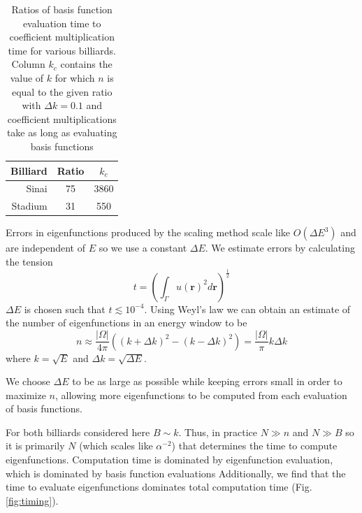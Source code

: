 \documentclass{report}
\newcommand{\rr}[0]{\mathbf{r}}
\begin{document}
\begin{table}
  \centering
  \begin{tabular}{|r|c|c|}
    \hline
    Billiard & Ratio & $k_c$ \\ \hline
    \hline
    Sinai & 75 & 3860 \\ \hline
    Stadium & 31 & 550 \\
    \hline
  \end{tabular}
  \caption{Ratios of basis function evaluation time to coefficient multiplication time for various billiards. Column $k_c$ contains the value of $k$ for which $n$ is equal to the given ratio with $\Delta k = 0.1$ and coefficient multiplications take as long as evaluating basis functions}
  \label{tab:eval_ratios}
\end{table}

Errors in eigenfunctions produced by the scaling method scale like $O({\Delta E}^{3})$ \cite{barnett_hassell} and are independent of $E$ so we use a constant $\Delta E$. We estimate errors by calculating the tension
\[
t = \left( \int_{\Gamma} u(\rr)^{2} d\rr \right)^{\frac{1}{2}}
\]
$\Delta E$ is chosen such that $t \lesssim 10^{-4}$. Using Weyl's law we can obtain an estimate of the number of eigenfunctions in an energy window to be
\[
n \approx \frac{\vert \Omega \vert}{4 \pi} ((k + \Delta k)^{2} - (k - \Delta k)^{2}) = \frac{\vert \Omega \vert}{\pi} k \Delta k
\]
where $k = \sqrt{E}$ and $\Delta k = \sqrt{\Delta E}$.

We choose $\Delta E$ to be as large as possible while keeping errors small in order to maximize $n$, allowing more eigenfunctions to be computed from each evaluation of basis functions.

For both billiards considered here $B \sim k$. Thus, in practice $N \gg n$ and $N \gg B$ so it is primarily $N$ (which scales like $\alpha^{-2}$) that determines the time to compute eigenfunctions. Computation time is dominated by eigenfunction evaluation, which is dominated by basis function evaluations Additionally, we find that the time to evaluate eigenfunctions dominates total computation time (Fig. \ref{fig:timing}).
\end{document}
